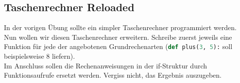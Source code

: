\subsection{Taschenrechner Reloaded }
In der vorigen Übung sollte ein simpler Taschenrechner programmiert werden. Nun wollen wir diesen Taschenrechner erweitern. Schreibe zuerst jeweils eine Funktion für jede der angebotenen Grundrechenarten (\lstinline[language=python]{def plus(3, 5):} soll beispielsweise 8 liefern).
\\Im Anschluss sollen die Rechenanweisungen in der if-Struktur durch Funktionsaufrufe ersetzt werden. Vergiss nicht, das Ergebnis auszugeben.
